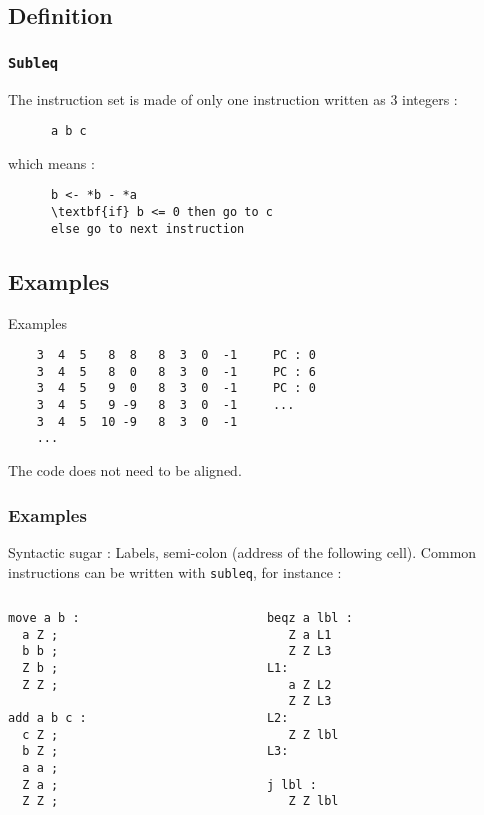 \documentclass{beamer}
\begin{document}
\subsection{Definition}
\begin{frame}[fragile]
    \frametitle{\texttt{Subleq}}

    The instruction set is made of only one instruction written as 3
    integers :
    \\[11pt]
    \begin{verbatim}
      a b c
    \end{verbatim}
    which means :

    \begin{verbatim}
      b <- *b - *a
      \textbf{if} b <= 0 then go to c
      else go to next instruction
    \end{verbatim}

\end{frame}

\subsection{Examples}
\begin{frame}[fragile]{Examples}
  \begin{verbatim}
    3  4  5   8  8   8  3  0  -1     PC : 0
    3  4  5   8  0   8  3  0  -1     PC : 6
    3  4  5   9  0   8  3  0  -1     PC : 0
    3  4  5   9 -9   8  3  0  -1     ...
    3  4  5  10 -9   8  3  0  -1
    ...
  \end{verbatim}
  The code does not need to be aligned.
\end{frame}

\begin{frame}[fragile]
    \frametitle{Examples}
Syntactic sugar : Labels, semi-colon (address of the following cell).
Common instructions can be written with \texttt{subleq}, for instance :

\begin{columns}[t]
    \begin{column}[T]{3cm}
\begin{verbatim}
move a b :
  a Z ;
  b b ;
  Z b ;
  Z Z ;

add a b c :
  c Z ;
  b Z ;
  a a ;
  Z a ;
  Z Z ;
\end{verbatim}
    \end{column}
\begin{column}[T]{3cm}
\begin{verbatim}
beqz a lbl :
   Z a L1
   Z Z L3
L1:
   a Z L2
   Z Z L3
L2:
   Z Z lbl
L3:

j lbl :
   Z Z lbl
\end{verbatim}
\end{column}
\end{columns}
\end{frame}
\end{document}
